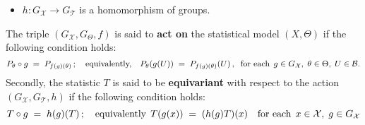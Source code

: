 \begin{definition}
\begin{itemize}
	\item $h:G_{\mathcal{X}} \longrightarrow G_{\mathcal{T}}$ is a homomorphism of groups.
\end{itemize}
The triple $(G_{\mathcal{X}}, G_{\Theta}, f)$ is said to \textbf{act on} the statistical model
$\left(X,\Theta\right)$ if the following condition holds:
\begin{equation*}
P_{\theta}\circ g \; = \; P_{f(g)(\theta)}
\,;\quad\textnormal{equivalently,}\quad
P_{\theta}\!\left(g(U)\right) \; = \; P_{f(g)(\theta)}\!\left(U\right),
\;\;\textnormal{for each}\;\, g \in G_{\mathcal{X}},\; \theta \in \Theta,\; U \in \mathcal{B}.
\end{equation*}
Secondly,%
the statistic $T$ is said to be \textbf{equivariant} with respect to the action $(G_{\mathcal{X}},G_{\mathcal{T}},h)$
if the following condition holds:
\begin{equation*}
T \circ g \; = \; h(g)(T) \,;
\quad\textnormal{equivalently}\,\;
T(g(x)) \; = \; (h(g)T)(x)
\quad\textnormal{for each}\;\, x \in \mathcal{X}, \; g \in G_{\mathcal{X}}
\end{equation*}
\end{definition}
